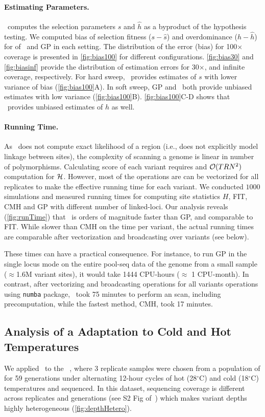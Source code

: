 \paragraph{Estimating Parameters.}
\comale\ computes the selection parameters $\hat{s}$ and $\hat{h}$ as
a byproduct of the hypothesis testing. We computed bias of selection
fitness ($s-\hat{s}$) and overdominance ($h-\hat{h}$) for of \comale\
and GP in each setting. The distribution of the error (bias) for
100$\times$ coverage is presented in \ref{fig:bias100} for
different configurations.
\ref{fig:bias30} and \ref{fig:biasinf} provide the
distribution of estimation errors for 30$\times$, and infinite
coverage, respectively.  For hard sweep, \comale\ provides estimates
of $s$ with lower variance of bias (\ref{fig:bias100}A). In soft
sweep, GP and \comale\ both provide unbiased estimates with low
variance (\ref{fig:bias100}B). \ref{fig:bias100}C-D shows
that \comale\ provides unbiased estimates of $h$ as well.

\paragraph{Running Time.}
As \comale\ does not compute exact likelihood of a region (i.e., does
not explicitly model linkage between sites), the complexity of
scanning a genome is linear in number of polymorphisms.  Calculating
score of each variant requires and ${\cal O}(TRN^2)$ computation
for ${\cal H}$. However, most of the operations
are can be vectorized for all replicates to make the effective running
time for each variant.  We
conducted $1000$ simulations and measured running times for computing site 
statistics $H$, FIT, CMH and GP with different number of linked-loci.  Our
analysis reveals (\ref{fig:runTime}) that \comale\ is orders of
magnitude faster than GP, and comparable to FIT. While slower than CMH
on the time per variant, the actual running times are comparable after
vectorization and broadcasting over variants (see below).

These times can have a practical consequence. For instance, to run GP
in the single locus mode on the entire pool-seq data of the \dmel genome from a
small sample ($\approx$1.6M variant sites), it would take 1444 CPU-hours
($\approx$ 1 CPU-month). In contrast, after vectorizing and
broadcasting operations for all variants operations using
\texttt{numba} package, \comale\ took 75 minutes to perform an
scan, including precomputation, while the fastest method, CMH, took 17 minutes.

\subsection{Analysis of a \dmel Adaptation to Cold and Hot 
Temperatures}\label{sec:dmel}
We applied \comale\ to the 
\datadm~\cite{orozco2012adaptation,franssen2015patterns}, where
3 replicate samples were chosen from a population of \dmel for 59
generations under alternating 12-hour cycles of hot (28$^{\circ}$C)
and cold (18$^{\circ}$C) temperatures and sequenced.  In this dataset,
sequencing coverage is different across replicates and generations
(see S2 Fig of~\cite{Terhorst2015Multi}) which makes variant depths
highly heterogeneous (\ref{fig:depthHetero}). 

